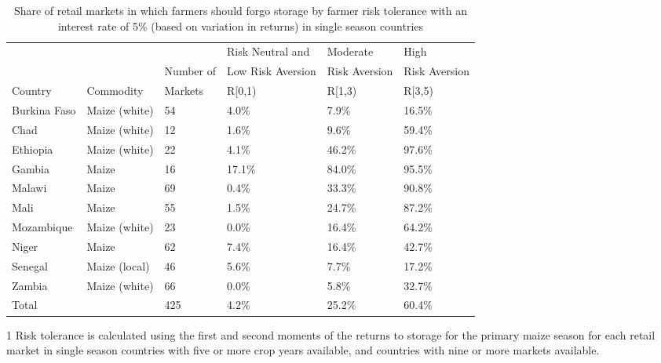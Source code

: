 \begin{table}[ht]
	\begin{threeparttable}[t]
		\centering
		\caption{Share of retail markets in which farmers should forgo storage by farmer risk tolerance with an interest rate of 5\% (based on variation in returns) in single season countries}
		\label{tab:risk_return_i}
		\begin{tabular}{|lll|lll|}
			\hline 
			&  & & Risk Neutral and & Moderate & High \\ 
			& & Number of  & Low Risk Aversion & Risk Aversion &  Risk Aversion\\ 
			Country&Commodity & Markets& R\in[0,1) &  R\in[1,3) & R\in[3,5) \\
			\hline
Burkina Faso & Maize (white) & 54 & 4.0\% & 7.9\% & 16.5\% \\ 
  Chad & Maize (white) & 12 & 1.6\% & 9.6\% & 59.4\% \\ 
  Ethiopia & Maize (white) & 22 & 4.1\% & 46.2\% & 97.6\% \\ 
  Gambia & Maize & 16 & 17.1\% & 84.0\% & 95.5\% \\ 
  Malawi & Maize & 69 & 0.4\% & 33.3\% & 90.8\% \\ 
  Mali & Maize & 55 & 1.5\% & 24.7\% & 87.2\% \\ 
  Mozambique & Maize (white) & 23 & 0.0\% & 16.4\% & 64.2\% \\ 
  Niger & Maize & 62 & 7.4\% & 16.4\% & 42.7\% \\ 
  Senegal & Maize (local) & 46 & 5.6\% & 7.7\% & 17.2\% \\ 
  Zambia & Maize (white) & 66 & 0.0\% & 5.8\% & 32.7\% \\ 
  \hline
  Total &  & 425 & 4.2\% & 25.2\% & 60.4\% \\ 
  \hline 
\end{tabular}
\begin{tablenotes}
\item [1] \footnotesize Risk tolerance is calculated using the first and second moments of the returns to storage for the primary maize season for each retail market in single season countries with five or more crop years available, and countries with nine or more markets available.
\end{tablenotes}
\end{threeparttable}
\end{table}
